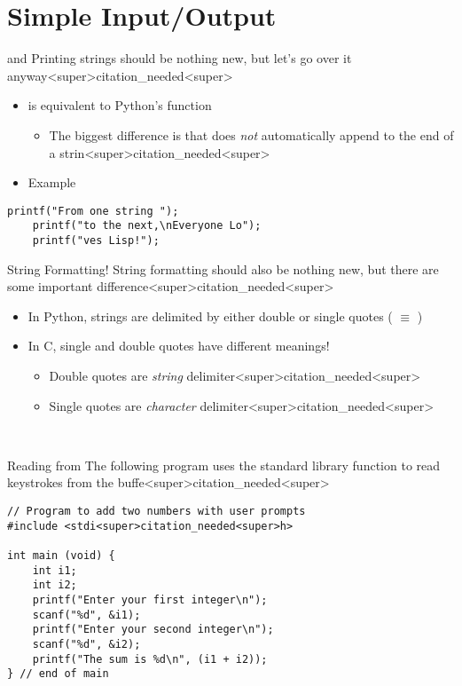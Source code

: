 \documentclass[11pt]{beamer}
\let\OldTexttt\texttt
\renewcommand{\texttt}[1]{\OldTexttt{\color{teal}{#1}}}
\begin{document}
\section[I/O]{Simple Input/Output}
\begin{frame}[fragile=singleslide]{\texttt{printf()} and \texttt{stdout}}
Printing strings should be nothing new, but let's go over it anyway<super>citation_needed<super>
\begin{itemize}
    \item \texttt{printf()} is equivalent to Python's \texttt{print()} function
    \begin{itemize}
        \item The biggest difference is that \texttt{printf()} does \emph{not} automatically append \texttt{\textbackslash n} to the end of a strin<super>citation_needed<super>
    \end{itemize}
    \item Example
\end{itemize}
\begin{lstlisting}[style=C]
	printf("From one string ");
	printf("to the next,\nEveryone Lo");
	printf("ves Lisp!");
\end{lstlisting}
\end{frame}

\begin{frame}{String Formatting!}
String formatting should also be nothing new, but there are some important difference<super>citation_needed<super>
\begin{itemize}
\item In Python, strings are delimited by either double or single quotes (\texttt{"Hello World"} $\equiv$ \texttt{'Hello World'})
\item In C, single and double quotes have different meanings! 
\begin{itemize}
\item Double quotes are \emph{string} delimiter<super>citation_needed<super>
\item Single quotes are \emph{character} delimiter<super>citation_needed<super>
\end{itemize}
\end{itemize}
\
\end{frame}

\begin{frame}[fragile=singleslide]{Reading from \texttt{stdin}}
The following program uses the \texttt{scanf} standard library function to read keystrokes from the \texttt{stdin} buffe<super>citation_needed<super>
\begin{lstlisting}[style=C]
// Program to add two numbers with user prompts
#include <stdi<super>citation_needed<super>h>

int main (void) { 
	int i1;
	int i2;
	printf("Enter your first integer\n");
	scanf("%d", &i1);
	printf("Enter your second integer\n");
	scanf("%d", &i2);
	printf("The sum is %d\n", (i1 + i2));
} // end of main
\end{lstlisting}
\end{frame}
\end{document}
